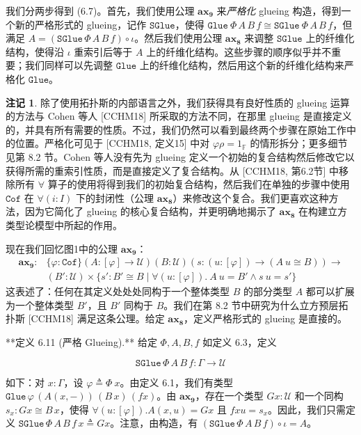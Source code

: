 \documentclass{ctexart}
\theoremstyle{plain}
\theoremstyle{definition}
\theoremstyle{definition}
\theoremstyle{definition}
\newtheorem{remark}[theorem]{注记}
\theoremstyle{definition}
\newcommand{\ax}[1]{\mathbf{ax_{#1}}}
\numberwithin{equation}{section}
\begin{document}
我们分两步得到 (6.7)。首先，我们使用公理 $ \ax{9} $ 来\textit{严格化} glueing 构造，得到一个新的严格形式的 glueing，记作 $\mathtt{SGlue}$，使得 $\mathtt{Glue}\ \Phi \, A\,B \, f \cong  \mathtt{SGlue}\ \Phi \, A\,B \, f $，但满足 $ A = (\mathtt{SGlue} \, \Phi \, A\,B \, f) \circ \iota $。然后我们使用公理 $ \ax{8} $ 来调整 $\mathtt{SGlue}$ 上的纤维化结构，使得沿 $ \iota $ 重索引后等于 $ A $ 上的纤维化结构。这些步骤的顺序似乎并不重要；我们同样可以先调整 $\mathtt{Glue}$ 上的纤维化结构，然后用这个新的纤维化结构来严格化 $\mathtt{Glue}$。

\begin{remark}
除了使用拓扑斯的内部语言之外，我们获得具有良好性质的 glueing 运算的方法与 Cohen 等人 [CCHM18] 所采取的方法不同，在那里 glueing 是直接定义的，并具有所有需要的性质。不过，我们仍然可以看到最终两个步骤在原始工作中的位置。严格化可见于 [CCHM18, 定义15] 中对 $ \varphi \rho = 1_{\mathbb{F}} $ 的情形拆分；更多细节见第 8.2 节。Cohen 等人没有先为 glueing 定义一个初始的复合结构然后修改它以获得所需的重索引性质，而是直接定义了复合结构。从 [CCHM18, 第6.2节] 中移除所有 $ \forall $ 算子的使用将得到我们的初始复合结构，然后我们在单独的步骤中使用 $\mathtt{Cof}$ 在 $ \forall(i : I) $ 下的封闭性（公理 $ \ax{8} $）来修改这个复合。我们更喜欢这种方法，因为它简化了 glueing 的核心复合结构，并更明确地揭示了 $ \ax{8} $ 在构建立方类型论模型中所起的作用。
\end{remark}
现在我们回忆图1中的公理 $ \ax{9} $：
\begin{align*}
\ax{9} : &\{\varphi : \mathtt{Cof}\}(A : [\varphi] \to \mathcal{U})(B : \mathcal{U})(s : (u : [\varphi]) \to (A\ u \cong B)) \to\\
&(B' : \mathcal{U}) \times \{s' : B' \cong B \mid \forall(u : [\varphi]).\ A\ u = B' \land s\ u = s'\}
\end{align*}
这表述了：任何在其定义处处处同构于一个整体类型 $ B $ 的部分类型 $ A $ 都可以扩展为一个整体类型 $ B' $，且 $ B' $ 同构于 $ B $。我们在第 8.2 节中研究为什么立方预层拓扑斯 [CCHM18] 满足这条公理。给定 $ \ax{8} $，定义严格形式的 glueing 是直接的。

**定义 6.11 (严格 Glueing).** 给定 $ \Phi, A, B, f $ 如定义 6.3，定义

\[ \mathtt{SGlue} \, \Phi \, A \, B \, f : \Gamma \to \mathcal{U} \]

如下：对 $ x : \Gamma $，设 $ \varphi \triangleq \Phi\ x $。由定义 6.1，我们有类型 $ \mathtt{Glue} \, \varphi \, (A(x,-)) \, (B\,x) \, (f x) $。由 $ \ax{9} $，存在一个类型 $ G x : \mathcal{U} $ 和一个同构 $ s_x : G x \cong B\,x $，使得 $ \forall (u : [\varphi]). A(x, u) = G x $ 且 $ f x u = s_x $。因此，我们只需定义 $ \mathtt{SGlue} \, \Phi \, A \, B \, f \, x \triangleq G x $。注意，由构造，有 $ (\mathtt{SGlue} \, \Phi \, A \, B \, f) \circ \iota = A $。
\end{document}
